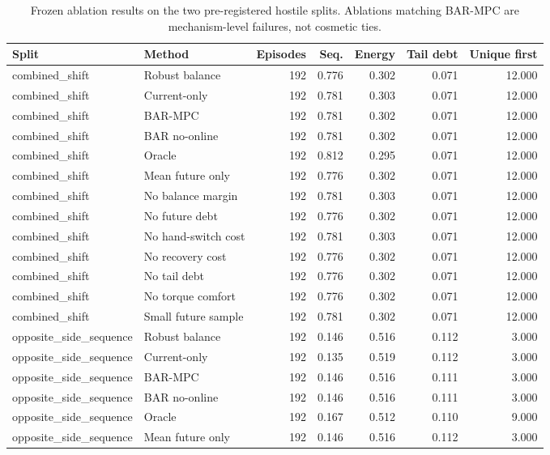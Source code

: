 \begin{table}[t]
\centering
\caption{Frozen ablation results on the two pre-registered hostile splits. Ablations matching BAR-MPC are mechanism-level failures, not cosmetic ties.}
\label{tab:ablation}
\scriptsize
\begin{tabular}{llrrrrr}
\toprule
Split & Method & Episodes & Seq. & Energy & Tail debt & Unique first \\
\midrule
combined\_shift & Robust balance & 192 & 0.776 & 0.302 & 0.071 & 12.000 \\
combined\_shift & Current-only & 192 & 0.781 & 0.303 & 0.071 & 12.000 \\
combined\_shift & BAR-MPC & 192 & 0.781 & 0.302 & 0.071 & 12.000 \\
combined\_shift & BAR no-online & 192 & 0.781 & 0.302 & 0.071 & 12.000 \\
combined\_shift & Oracle & 192 & 0.812 & 0.295 & 0.071 & 12.000 \\
combined\_shift & Mean future only & 192 & 0.776 & 0.302 & 0.071 & 12.000 \\
combined\_shift & No balance margin & 192 & 0.781 & 0.303 & 0.071 & 12.000 \\
combined\_shift & No future debt & 192 & 0.776 & 0.302 & 0.071 & 12.000 \\
combined\_shift & No hand-switch cost & 192 & 0.781 & 0.303 & 0.071 & 12.000 \\
combined\_shift & No recovery cost & 192 & 0.776 & 0.302 & 0.071 & 12.000 \\
combined\_shift & No tail debt & 192 & 0.776 & 0.302 & 0.071 & 12.000 \\
combined\_shift & No torque comfort & 192 & 0.776 & 0.302 & 0.071 & 12.000 \\
combined\_shift & Small future sample & 192 & 0.781 & 0.302 & 0.071 & 12.000 \\
opposite\_side\_sequence & Robust balance & 192 & 0.146 & 0.516 & 0.112 & 3.000 \\
opposite\_side\_sequence & Current-only & 192 & 0.135 & 0.519 & 0.112 & 3.000 \\
opposite\_side\_sequence & BAR-MPC & 192 & 0.146 & 0.516 & 0.111 & 3.000 \\
opposite\_side\_sequence & BAR no-online & 192 & 0.146 & 0.516 & 0.111 & 3.000 \\
opposite\_side\_sequence & Oracle & 192 & 0.167 & 0.512 & 0.110 & 9.000 \\
opposite\_side\_sequence & Mean future only & 192 & 0.146 & 0.516 & 0.112 & 3.000 \\

\end{tabular}
\end{table}
